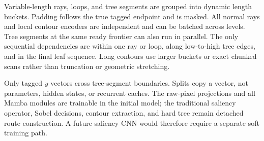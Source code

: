 Variable-length rays, loops, and tree segments are grouped into dynamic length buckets. Padding follows the true tagged endpoint and is masked. All normal rays and local contour encoders are independent and can be batched across levels. Tree segments at the same ready frontier can also run in parallel. The only sequential dependencies are within one ray or loop, along low-to-high tree edges, and in the final leaf sequence. Long contours use larger buckets or exact chunked scans rather than truncation or geometric stretching.

Only tagged $y$ vectors cross tree-segment boundaries. Splits copy a vector, not parameters, hidden states, or recurrent caches. The raw-pixel projections and all Mamba modules are trainable in the initial model; the traditional saliency operator, Sobel decisions, contour extraction, and hard tree remain detached route construction. A future saliency CNN would therefore require a separate soft training path.
